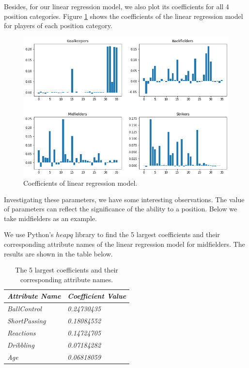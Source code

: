\documentclass{article}
\begin{document}
Besides, for our linear regression model, we also plot its coefficients for all 4 position categories. Figure \ref{fig5} shows the coefficients of the linear regression model for players of each position category.

\begin{figure}[!htb]
	\centering
    \includegraphics[scale=0.5]{coefs.png}
    \caption{Coefficients of linear regression model.}\label{fig5}
\end{figure}

Investigating these parameters, we have some interesting observations. The value of parameters can reflect the significance of the ability to a position. Below we take midfielders as an example.

We use Python's $heapq$ library to find the 5 largest coefficients and their corresponding attribute names of the linear regression model for midfielders. The results are shown in the table below.

\begin{table}[htpb]
    \centering
    \begin{tabular}{|l|l|}
    \hline
    \textit{Attribute Name}             &       \textit{Coefficient Value} \\ \hline
    \textit{BallControl}                &       \textit{0.24730435} \\ \hline
    \textit{ShortPassing}               &       \textit{0.18084552} \\ \hline
    \textit{Reactions}                  &       \textit{0.14724705} \\ \hline
    \textit{Dribbling}                  &       \textit{0.07184282} \\ \hline
    \textit{Age}                        &       \textit{0.06818059} \\ \hline
    \end{tabular}
    \caption{The 5 largest coefficients and their corresponding attribute names.}
\end{table}
\end{document}
